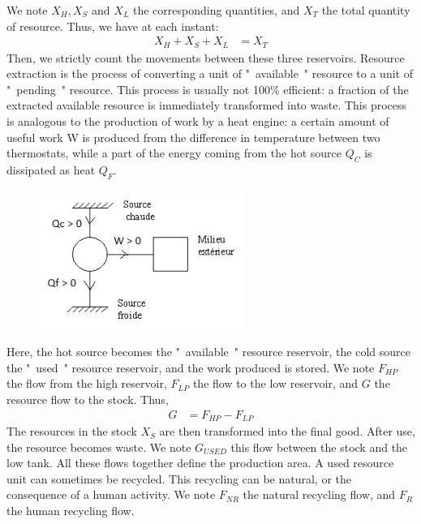 \documentclass[12pt,a4paper]{article}%
\begin{document}
\begin{appendix}
We note $X_{H},X_{S}$ and $X_{L}$ the corresponding quantities, and $X_{T}$ the total quantity of resource.  Thus, we have at each instant:
\begin{align}
	X_{H}+X_{S}+X_{L}&=X_{T}
\end{align} 
Then, we strictly count the movements between these three reservoirs.  Resource extraction is the process of converting a unit of "~available~" resource to a unit of "~pending~" resource. This process is usually not 100\% efficient: a fraction of the extracted available resource is immediately transformed into waste. This process is analogous to the production of work by a heat engine: a certain amount of useful work W is produced from the difference in temperature between two thermostats, while a part of the energy coming from the hot source $Q_{C}$ is dissipated as heat $Q_{F}$.  
\begin{figure}[h] 
	\centering 
	\includegraphics[width=0.6\textwidth]{figures/Carnot.jpg}
\end{figure} 
Here, the hot source becomes the "~available~" resource reservoir, the cold source the "~used~" resource reservoir, and the work produced is stored.  We note $F_{HP}$ the flow from the high reservoir, $F_{LP}$ the flow to the low reservoir, and $G$ the resource flow to the stock. Thus,
\begin{align}
	G & = F_{HP}-F_{LP}
\end{align} 
The resources in the stock $X_{S}$ are then transformed into the final good. After use, the resource becomes waste. We note $G_{USED}$ this flow between the stock and the low tank.  All these flows together define the production area. A used resource unit can sometimes be recycled. This recycling can be natural, or the consequence of a human activity. We note $F_{NR}$ the natural recycling flow, and $F_{R}$ the human recycling flow. 


\end{appendix}
\end{document}
